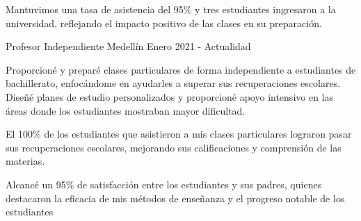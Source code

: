 \begin{cventries}
{\begin{cvitems}
    \item {Mantuvimos una tasa de asistencia del 95\% y tres estudiantes ingresaron a la universidad, reflejando el impacto positivo de las clases en su preparación.}
  \end{cvitems}
}
\cventry
{Profesor} %
{Independiente} %
{Medellín} %
{Enero 2021 - Actualidad} %
{
  \begin{cvitems}
    \item {Proporcioné y preparé clases particulares de forma independiente a estudiantes de bachillerato, enfocándome en ayudarles
    a superar sus recuperaciones escolares. Diseñé planes de estudio personalizados y proporcioné apoyo intensivo en las
    áreas donde los estudiantes mostraban mayor dificultad.}
    \item {El 100\% de los estudiantes que asistieron a mis clases particulares lograron pasar sus recuperaciones escolares,
    mejorando sus calificaciones y comprensión de las materias.}
    \item {Alcancé un 95\% de satisfacción entre los estudiantes y sus padres, quienes destacaron la eficacia de mis métodos de
    enseñanza y el progreso notable de los estudiantes}
  \end{cvitems}
}
\end{cventries}